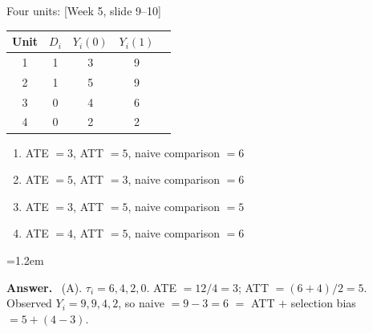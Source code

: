 \documentclass[11pt]{article}
\newenvironment{answer}{\par\smallskip
  \begin{list}{}{\leftmargin=1.2em\rightmargin=0pt}\item[]\color{dukeblue}%
  \textbf{Answer.}\ }{\end{list}\smallskip}
\newcommand{\slideref}[2]{{\footnotesize\color{gray}[Week #1, slide #2]}}
\begin{document}
\begin{enumerate}[leftmargin=*,itemsep=8pt]
\item Four units: \slideref{5}{9--10}
\begin{center}\small
\renewcommand{\arraystretch}{1.05}
\begin{tabular}{ccccc}
\toprule
Unit & $D_i$ & $Y_i(0)$ & $Y_i(1)$ \\
\midrule
1 & 1 & 3 & 9 \\
2 & 1 & 5 & 9 \\
3 & 0 & 4 & 6 \\
4 & 0 & 2 & 2 \\
\bottomrule
\end{tabular}
\end{center}
      \begin{enumerate}[label=(\Alph*),itemsep=0pt]
      \item ATE $= 3$, ATT $= 5$, naive comparison $= 6$
      \item ATE $= 5$, ATT $= 3$, naive comparison $= 6$
      \item ATE $= 3$, ATT $= 5$, naive comparison $= 5$
      \item ATE $= 4$, ATT $= 5$, naive comparison $= 6$
      \end{enumerate}
\begin{answer}
(A). $\tau_i = 6, 4, 2, 0$. ATE $= 12/4 = 3$; ATT $= (6+4)/2 = 5$. Observed $Y_i = 9, 9, 4,
2$, so naive $= 9 - 3 = 6$ $=$ ATT $+$ selection bias $= 5 + (4 - 3)$.
\end{answer}


\end{enumerate}
\end{document}
